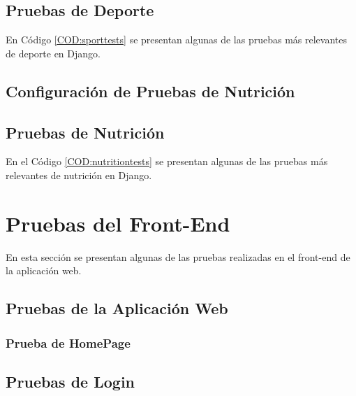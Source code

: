 \newpage
\subsection{Pruebas de Deporte}
En Código \ref{COD:sporttests} se presentan algunas de las pruebas más relevantes de deporte en Django.

\newpage

\subsection{Configuración de Pruebas de Nutrición}

\newpage
\subsection{Pruebas de Nutrición}
En el Código \ref{COD:nutritiontests} se presentan algunas de las pruebas más relevantes de nutrición en Django.

\newpage

\section{Pruebas del Front-End\label{SEC:PRUEBASFRONTEND}}
En esta sección se presentan algunas de las pruebas realizadas en el front-end de la aplicación web.

\subsection{Pruebas de la Aplicación Web}
\subsubsection{Prueba de HomePage}

\newpage

\subsection{Pruebas de Login}

